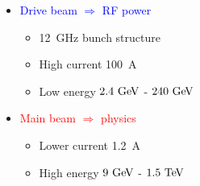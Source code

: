 {\begin{frame}
    \vspace{-0.3cm}
    \begin{columns}
      \begin{itemize}
      \item \textcolor{blue}{Drive beam $\Rightarrow$ RF power}
        \begin{itemize}
        \item 12~GHz bunch structure
        \item High current 100~A
        \item Low energy $2.4\,\mathrm{\,Ge\kern -0.1em V}$ - $240\,\mathrm{\,Ge\kern -0.1em V}$
        \end{itemize}
      \item \textcolor{red}{Main beam $\Rightarrow$ physics}
        \begin{itemize}
        \item Lower current 1.2~A
        \item High energy $9\,\mathrm{\,Ge\kern -0.1em V}$ - $1.5\,\mathrm{\,Te\kern -0.1em V}$
        \end{itemize}
      \end{itemize}
    \end{columns}

  \end{frame}
}

